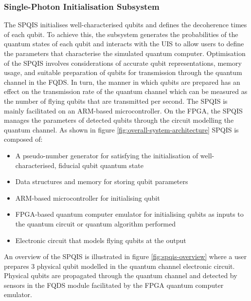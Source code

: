 \subsubsection{Single-Photon Initialisation Subsystem}
The SPQIS initialises well-characterised qubits and defines the decoherence times of each qubit. To achieve this, the subsystem generates the probabilities of the quantum states of each qubit and interacts with the UIS to allow users to define the parameters that characterise the simulated quantum computer. Optimisation of the SPQIS involves considerations of accurate qubit representations, memory usage, and suitable preparation of qubits for transmission through the quantum channel in the FQDS. In turn, the manner in which qubits are prepared has an effect on the transmission rate of the quantum channel which can be measured as the number of flying qubits that are transmitted per second. The SPQIS is mainly facilitated on an ARM-based microcontroller. On the FPGA, the SPQIS manages the parameters of detected qubits through the circuit modelling the quantum channel. As shown in figure \ref{fig:overall-system-architecture} SPQIS is composed of:
\begin{itemize}
	\item 
	A pseudo-number generator for satisfying the initialisation of well-characterised, fiducial qubit quantum state	
	\item 
	Data structures and memory for storing qubit parameters
	\item 
	ARM-based microcontroller for initialising qubit
	\item 
	FPGA-based quantum computer emulator for initialising qubits as inputs to the quantum circuit or quantum algorithm performed
	\item 
	Electronic circuit that models flying qubits at the output
\end{itemize}
An overview of the SPQIS is illustrated in figure \ref{fig:spqis-overview} where a user prepares 3 physical qubit modelled in the quantum channel electronic circuit. Physical qubits are propagated through the quantum channel and detected by sensors in the FQDS module facilitated by the FPGA quantum computer emulator. 
